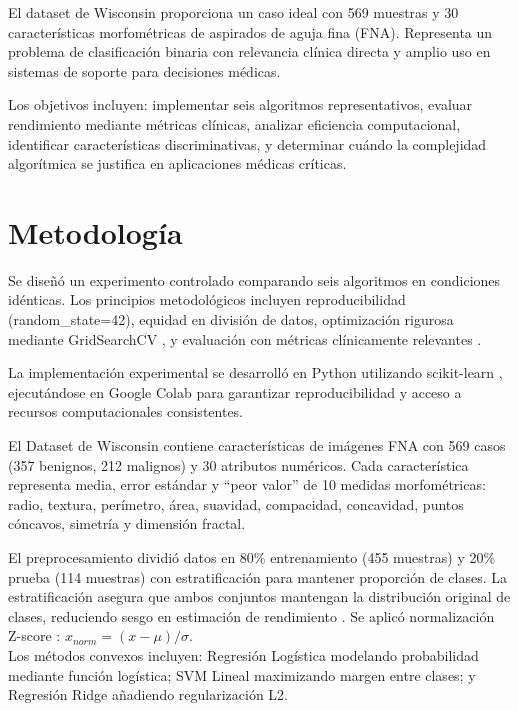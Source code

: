 \documentclass[conference]{IEEEtran}
\begin{document}
El dataset de Wisconsin \cite{wolberg1995} proporciona un caso ideal con 569 muestras y 30 características morfométricas de aspirados de aguja fina (FNA). Representa un problema de clasificación binaria con relevancia clínica directa y amplio uso en sistemas de soporte para decisiones médicas.

Los objetivos incluyen: implementar seis algoritmos representativos, evaluar rendimiento mediante métricas clínicas, analizar eficiencia computacional, identificar características discriminativas, y determinar cuándo la complejidad algorítmica se justifica en aplicaciones médicas críticas.

\section{Metodología}

Se diseñó un experimento controlado comparando seis algoritmos en condiciones idénticas. Los principios metodológicos incluyen reproducibilidad (random\_state=42), equidad en división de datos, optimización rigurosa mediante GridSearchCV \cite{bergstra2012}, y evaluación con métricas clínicamente relevantes \cite{fawcett2006}.

La implementación experimental se desarrolló en Python utilizando scikit-learn \cite{pedregosa2011}, ejecutándose en Google Colab para garantizar reproducibilidad y acceso a recursos computacionales consistentes.

El Dataset de Wisconsin \cite{street1993} contiene características de imágenes FNA con 569 casos (357 benignos, 212 malignos) y 30 atributos numéricos. Cada característica representa media, error estándar y ``peor valor'' de 10 medidas morfométricas: radio, textura, perímetro, área, suavidad, compacidad, concavidad, puntos cóncavos, simetría y dimensión fractal.

El preprocesamiento dividió datos en 80\% entrenamiento (455 muestras) y 20\% prueba (114 muestras) con estratificación \cite{kohavi1995} para mantener proporción de clases. La estratificación asegura que ambos conjuntos mantengan la distribución original de clases, reduciendo sesgo en estimación de rendimiento \cite{kohavi1995}. Se aplicó normalización Z-score \cite{jain2005}: $x_{norm} = (x - \mu)/\sigma$.\\

Los métodos convexos \cite{boyd2004} incluyen: Regresión Logística modelando probabilidad mediante función logística; SVM Lineal \cite{vapnik1995} maximizando margen entre clases; y Regresión Ridge \cite{hoerl1970} añadiendo regularización L2.
\end{document}
